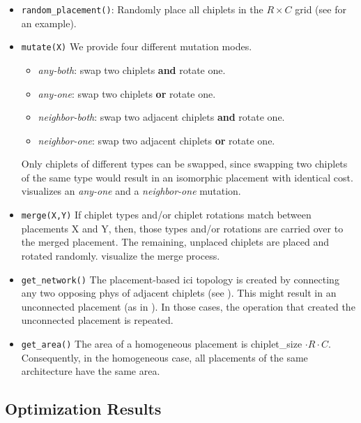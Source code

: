 \begin{itemize}
	\item \texttt{random\_placement()}:
	Randomly place all chiplets in the $R \times C$ grid (see  for an example).
	\item	\texttt{mutate(X)}
	We provide four different mutation modes.
	\begin{itemize}
		\item \emph{any-both}: swap two chiplets \textbf{and} rotate one.
		\item \emph{any-one}: swap two chiplets \textbf{or} rotate one.
		\item \emph{neighbor-both}: swap two adjacent chiplets \textbf{and} rotate one.
		\item \emph{neighbor-one}: swap two adjacent chiplets \textbf{or} rotate one.
	\end{itemize}
	Only chiplets of different types can be swapped, since swapping two chiplets of the same type would result in an isomorphic placement with identical cost.
	 visualizes an \emph{any-one} and a \emph{neighbor-one} mutation.

	\item	\texttt{merge(X,Y)}
	If chiplet types and/or chiplet rotations match between placements X and Y, then, those types and/or rotations are carried over to the merged placement.
	The remaining, unplaced chiplets are placed and rotated randomly.
	 visualize the merge process.

	\item	\texttt{get\_network()}
	The placement-based \gls{ici} topology is created by connecting any two opposing \gls{phys} of adjacent chiplets (see ).
	This might result in an unconnected placement (as in ).
	In those cases, the operation that created the unconnected placement is repeated.

	\item	\texttt{get\_area()}
	The area of a homogeneous placement is chiplet\_size $\cdot R \cdot C$.
	Consequently, in the homogeneous case, all placements of the same architecture have the same area.
\end{itemize}



\subsection{Optimization Results}
\label{ssec:homo-opt}

